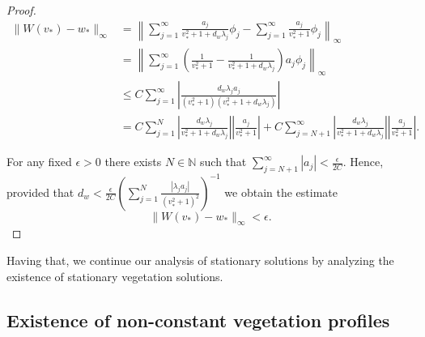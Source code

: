 \documentclass[11pt, a4paper]{article}
\theoremstyle{break}
\theoremstyle{break}
\theoremstyle{break}
\theoremstyle{break}
\theoremstyle{break}
\theoremstyle{break}
\theoremstyle{break}
\theoremstyle{break}
\theoremstyle{break}
\theoremstyle{break}
\begin{document}
\begin{proof}
\begin{align*}
    \|W(v_*) - w_*\|_\infty 
    &= 
    \left\|
        \sum_{j=1}^\infty 
        \frac{a_j}{v_*^2 + 1 + d_w \lambda_j} \phi_j 
        - 
        \sum_{j=1}^\infty 
        \frac{a_j}{v_*^2 + 1} \phi_j
    \right\|_\infty 
    \\[6pt]
    &=
    \left\|
        \sum_{j=1}^\infty
        \left(
            \frac{1}{v_*^2 + 1} 
            - 
            \frac{1}{v_*^2 + 1 + d_w \lambda_j}
        \right) 
        a_j \phi_j
    \right\|_\infty
    \\[6pt]
    &\leq
    C 
    \sum_{j=1}^\infty 
    \left| 
        \frac{d_w \lambda_j a_j}{(v_*^2 + 1)(v_*^2 + 1 + d_w \lambda_j)}
    \right|
    \\[6pt]
    &=
    C 
    \sum_{j=1}^N 
    \left| 
        \frac{d_w \lambda_j}{v_*^2 + 1 + d_w \lambda_j}
    \right|
    \left| 
        \frac{a_j}{v_*^2 + 1} 
    \right|
+
    C
    \sum_{j=N+1}^\infty 
    \left| 
        \frac{d_w \lambda_j}{v_*^2 + 1 + d_w \lambda_j}
    \right|
    \left| 
        \frac{a_j}{v_*^2 + 1} 
    \right|.
\end{align*}

    For any fixed $\epsilon > 0$ there exists $N \in \mathbb{N}$ such that $\sum_{j=N+1}^\infty |a_j| < \frac{\epsilon}{2C}$. Hence, provided that $d_w < \frac{\epsilon}{2C} \left(\sum_{j=1}^N \frac{|\lambda_j a_j|}{(v_*^2 + 1)^2}\right)^{-1}$ we obtain the estimate
    \begin{equation}
        \|W(v_*) - w_* \|_\infty < \epsilon.
    \end{equation}
\end{proof}

Having that, we continue our analysis of stationary solutions by analyzing the existence of stationary vegetation solutions.

\subsection{Existence of non-constant vegetation profiles}
\end{document}
